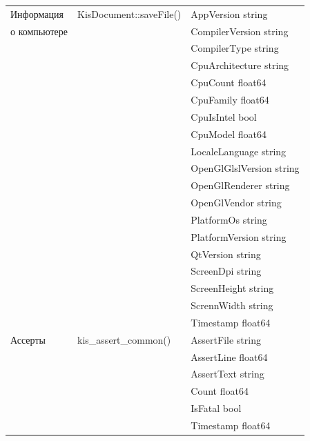 \begin{table}[!h]
\begin{center}
\begin{tabular}{|l|l|l|}
\hline

Информация  &

KisDocument::saveFile()	& 

AppVersion string 

\tabularnewline о компьютере & &  CompilerVersion   string 

\tabularnewline & & CompilerType      string 

\tabularnewline & & CpuArchitecture      string

\tabularnewline & & CpuCount     float64 

\tabularnewline & & CpuFamily      float64  

\tabularnewline & & CpuIsIntel    bool 

\tabularnewline & & CpuModel      float64  

\tabularnewline & & LocaleLanguage      string

\tabularnewline & & OpenGlGlslVersion     string

\tabularnewline & & OpenGlRenderer     string   

\tabularnewline & & OpenGlVendor    string 

\tabularnewline & & PlatformOs    string 

\tabularnewline & & PlatformVersion    string 

\tabularnewline & & QtVersion    string    

\tabularnewline & & ScreenDpi    string 

\tabularnewline & & ScreenHeight    string

\tabularnewline & & ScrennWidth    string 

\tabularnewline & & Timestamp     float64     \\            

\hline

Ассерты &

kis\_assert\_common()	& 

AssertFile string

\tabularnewline & &  AssertLine float64

\tabularnewline & & 	AssertText string

\tabularnewline & & 	Count float64

\tabularnewline & & 	IsFatal bool

\tabularnewline & & Timestamp     float64 \\

\hline

\end{tabular}

\end{center}

\end{table}
